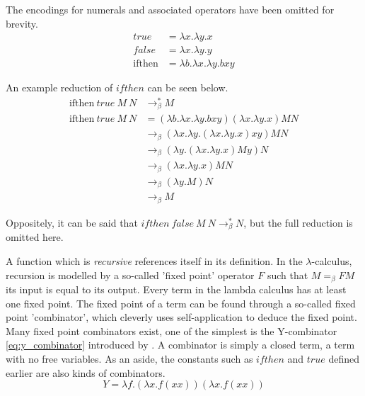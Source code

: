 \documentclass[12pt,a4paper]{report}
\theoremstyle{definition}
\theoremstyle{definition}
\theoremstyle{remark}
\begin{document}
The encodings for numerals and associated operators have been omitted for brevity.
\begin{equation}\label{eq:booleans}
\begin{split}
true &= \lambda x.\lambda y.x\\
false &= \lambda x.\lambda y.y\\
\text{ifthen} &= \lambda b. \lambda x.\lambda y.bxy
\end{split}
\end{equation}


An example reduction of $ifthen$ can be seen below.
\begin{equation*}
\begin{split}
\text{ifthen}\ true\ M\ N &\rightarrow_{\beta}^* M\\
\text{ifthen}\ true\ M\ N &= (\lambda b. \lambda x.\lambda y.bxy)(\lambda x.\lambda y.x) M N\\
& \rightarrow_{\beta} (\lambda x. \lambda y.(\lambda x.\lambda y.x) x y) M N\\
& \rightarrow_{\beta} (\lambda y.(\lambda x.\lambda y.x) M y) N\\
& \rightarrow_{\beta} (\lambda x.\lambda y.x) M N\\
& \rightarrow_{\beta} (\lambda y.M) N\\
& \rightarrow_{\beta} M
\end{split}
\end{equation*}

Oppositely, it can be said that $ifthen\ false\ M\ N \rightarrow_{\beta}^* N$, but the full reduction is omitted here.

A function which is \emph{recursive} references itself in its definition. In the $\lambda$-calculus, recursion is modelled by a so-called 'fixed point' operator $F$ such that $M =_{\beta} FM$ its input is equal to its output. Every term in the lambda calculus has at least one fixed point. The fixed point of a term can be found through a so-called fixed point 'combinator', which cleverly uses self-application to deduce the fixed point. Many fixed point combinators exist, one of the simplest is the Y-combinator \eqref{eq:y_combinator} introduced by \cite{curry_1930}. A combinator is simply a closed term, a term with no free variables. As an aside, the constants such as $ifthen$ and $true$ defined earlier are also kinds of combinators.
\begin{equation}\label{eq:y_combinator}
    Y = \lambda f.(\lambda x.f(xx))(\lambda x.f(xx))
\end{equation}
\end{document}
